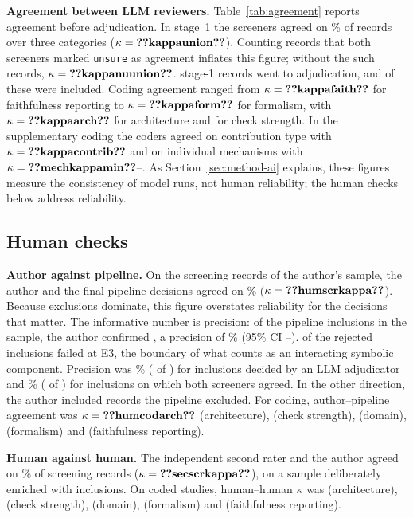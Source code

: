 \textbf{Agreement between LLM reviewers.} Table~\ref{tab:agreement} reports agreement before adjudication. In stage~1 the screeners agreed on \% of records over three categories ($\kappa=\cnt{kappaunion}$). Counting records that both screeners marked \texttt{unsure} as agreement inflates this figure; without the  such records, $\kappa=\cnt{kappanuunion}$.  stage-1 records went to adjudication, and  of these were included. Coding agreement ranged from $\kappa=\cnt{kappafaith}$ for faithfulness reporting to $\kappa=\cnt{kappaform}$ for formalism, with $\kappa=\cnt{kappaarch}$ for architecture and  for check strength. In the supplementary coding the coders agreed on contribution type with $\kappa=\cnt{kappacontrib}$ and on individual mechanisms with $\kappa=\cnt{mechkappamin}$--. As Section~\ref{sec:method-ai} explains, these figures measure the consistency of model runs, not human reliability; the human checks below address reliability.

\ifhumancheck
\subsection{Human checks}
\label{sec:selection-human}
\textbf{Author against pipeline.} On the  screening records of the author's sample, the author and the final pipeline decisions agreed on \% ($\kappa=\cnt{humscrkappa}$). Because exclusions dominate, this figure overstates reliability for the decisions that matter. The informative number is precision: of the  pipeline inclusions in the sample, the author confirmed , a precision of \% (95\% CI --).  of the  rejected inclusions failed at E3, the boundary of what counts as an interacting symbolic component. Precision was \% ( of ) for inclusions decided by an LLM adjudicator and \% ( of ) for inclusions on which both screeners agreed. In the other direction, the author included  records the pipeline excluded. For coding, author--pipeline agreement was $\kappa=\cnt{humcodarch}$ (architecture),  (check strength),  (domain),  (formalism) and  (faithfulness reporting).

\ifsecondrater
\textbf{Human against human.} The independent second rater and the author agreed on \% of  screening records ($\kappa=\cnt{secscrkappa}$), on a sample deliberately enriched with inclusions. On  coded studies, human--human $\kappa$ was  (architecture),  (check strength),  (domain),  (formalism) and  (faithfulness reporting).
\fi

